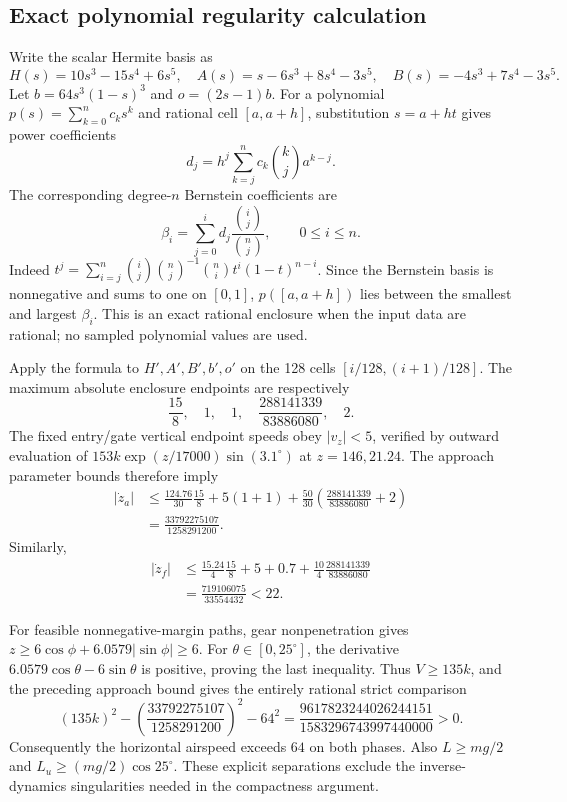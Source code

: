 
\subsection*{Exact polynomial regularity calculation}
Write the scalar Hermite basis as
\[
 H(s)=10s^3-15s^4+6s^5,\quad
 A(s)=s-6s^3+8s^4-3s^5,\quad
 B(s)=-4s^3+7s^4-3s^5.
\]
Let $b=64s^3(1-s)^3$ and $o=(2s-1)b$.  For a polynomial
$p(s)=\sum_{k=0}^n c_ks^k$ and rational cell $[a,a+h]$, substitution
$s=a+ht$ gives power coefficients
\[
 d_j=h^j\sum_{k=j}^n c_k\binom{k}{j}a^{k-j}.
\]
The corresponding degree-$n$ Bernstein coefficients are
\[
 \beta_i=\sum_{j=0}^i d_j\frac{\binom{i}{j}}{\binom{n}{j}},
 \qquad 0\le i\le n.
\]
Indeed $t^j=\sum_{i=j}^n\binom{i}{j}\binom{n}{j}^{-1}
\binom ni t^i(1-t)^{n-i}$.  Since the Bernstein basis is nonnegative
and sums to one on $[0,1]$, $p([a,a+h])$ lies between the smallest
and largest $\beta_i$.  This is an exact rational enclosure when
the input data are rational; no sampled polynomial values are used.

Apply the formula to $H',A',B',b',o'$ on the 128 cells
$[i/128,(i+1)/128]$.  The maximum absolute enclosure endpoints are
respectively
\[
 \frac{15}{8},\quad1,\quad1,\quad
 \frac{288141339}{83886080},\quad2.
\]
The fixed entry/gate vertical endpoint speeds obey
$|v_z|<5$, verified by outward evaluation of
$153k\exp(z/17000)\sin(3.1^\circ)$ at $z=146,21.24$.
The approach parameter bounds therefore imply
\begin{align*}
 |\dot z_a|
 &\le\frac{124.76}{30}\frac{15}{8}
 +5(1+1)+\frac{50}{30}
 \left(\frac{288141339}{83886080}+2\right)\\
 &=\frac{33792275107}{1258291200}.
\end{align*}
Similarly,
\begin{align*}
 |\dot z_f|
 &\le\frac{15.24}{4}\frac{15}{8}
 +5+0.7+\frac{10}{4}\frac{288141339}{83886080}\\
 &=\frac{719106075}{33554432}<22.
\end{align*}

For feasible nonnegative-margin paths, gear nonpenetration gives
$z\ge6\cos\phi+6.0579|\sin\phi|\ge6$.
For $\theta\in[0,25^\circ]$, the derivative
$6.0579\cos\theta-6\sin\theta$ is positive, proving the last
inequality.  Thus $V\ge135k$, and the preceding approach bound
gives the entirely rational strict comparison
\[
 (135k)^2-
 \left(\frac{33792275107}{1258291200}\right)^2-64^2
 =\frac{9617823244026244151}{1583296743997440000}>0.
\]
Consequently the horizontal airspeed exceeds $64$ on both phases.
Also $L\ge mg/2$ and $L_u\ge(mg/2)\cos25^\circ$.
These explicit separations exclude the inverse-dynamics
singularities needed in the compactness argument.

